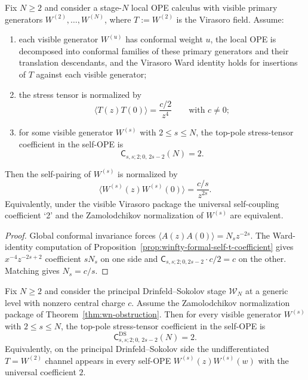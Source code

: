 \begin{proposition}
\label{prop:winfty-formal-self-normalization-from-t}
Fix $N \ge 2$ and consider a stage-$N$ local OPE calculus with visible
primary generators $W^{(2)},\dots,W^{(N)}$, where
$T:=W^{(2)}$ is the Virasoro field.  Assume:
\begin{enumerate}[label=\textup{(\roman*)}]
\item each visible generator $W^{(u)}$ has conformal weight $u$, the
  local OPE is decomposed into conformal families of these primary
  generators and their translation descendants, and the Virasoro Ward
  identity holds for insertions of $T$ against each visible generator;
\item the stress tensor is normalized by
  \[
  \langle T(z)T(0)\rangle=\frac{c/2}{z^4}
  \qquad\text{with } c\neq 0;
  \]
\item for some visible generator $W^{(s)}$ with $2 \le s \le N$, the
  top-pole stress-tensor coefficient in the self-OPE is
  \[
  \mathsf{C}_{s,s;2;0,\,2s-2}(N)=2.
  \]
\end{enumerate}
Then the self-pairing of $W^{(s)}$ is normalized by
\[
\langle W^{(s)}(z)W^{(s)}(0)\rangle=\frac{c/s}{z^{2s}}.
\]
Equivalently, under the visible Virasoro package the universal
self-coupling coefficient `2' and the Zamolodchikov normalization of
$W^{(s)}$ are equivalent.
\end{proposition}

\begin{proof}
Global conformal invariance forces $\langle A(z)A(0)\rangle = N_s z^{-2s}$.  The Ward-identity computation of Proposition~\ref{prop:winfty-formal-self-t-coefficient} gives $x^{-4}z^{-2s+2}$ coefficient $sN_s$ on one side and $\mathsf{C}_{s,s;2;0,2s-2}\cdot c/2 = c$ on the other.  Matching gives $N_s = c/s$.
\end{proof}

\begin{proposition}
\label{prop:winfty-ds-self-t-coefficient}
Fix $N \ge 2$ and consider the principal Drinfeld--Sokolov stage
$\mathcal{W}_N$ at a generic level with nonzero central charge $c$.
Assume the Zamolodchikov normalization package of
Theorem~\ref{thm:wn-obstruction}.  Then for every visible generator
$W^{(s)}$ with $2 \le s \le N$, the top-pole stress-tensor coefficient
in the self-OPE is
\[
\mathsf{C}^{\mathrm{DS}}_{s,s;2;0,\,2s-2}(N)=2.
\]
Equivalently, on the principal Drinfeld--Sokolov side the
undifferentiated $T=W^{(2)}$ channel appears in every self-OPE
$W^{(s)}(z)W^{(s)}(w)$ with the universal coefficient $2$.
\end{proposition}

